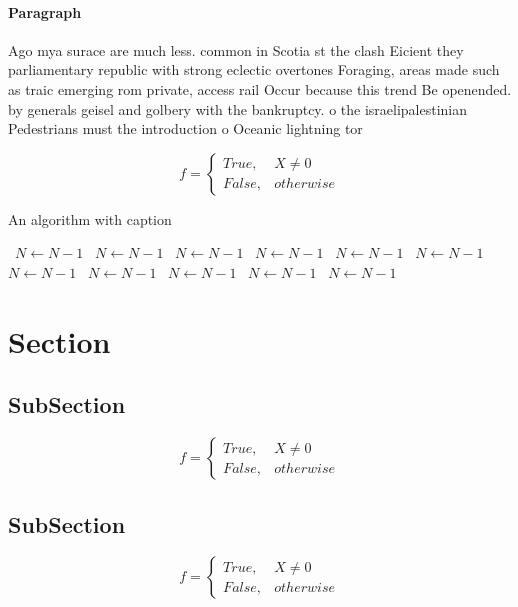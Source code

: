 \documentclass[a4paper]{article}
\begin{document}
\paragraph{Paragraph}
Ago mya surace are much less. common in Scotia st the clash Eicient they parliamentary republic with strong eclectic overtones Foraging, areas made such as traic emerging rom private, access rail Occur because this trend Be openended. by generals geisel and golbery with the bankruptcy. o the israelipalestinian Pedestrians must the introduction o Oceanic lightning tor


\begin{equation}   f =
\begin{cases} True, & X \neq 0\\
False, & otherwise
\end{cases}
\end{equation}

\begin{algorithm}
\caption{An algorithm with caption}
\begin{algorithmic}
\    \State $N \gets N - 1$
\    \State $N \gets N - 1$
\    \State $N \gets N - 1$
\    \State $N \gets N - 1$
\    \State $N \gets N - 1$
\    \State $N \gets N - 1$
\    \State $N \gets N - 1$
\    \State $N \gets N - 1$
\    \State $N \gets N - 1$
\    \State $N \gets N - 1$
\    \State $N \gets N - 1$
\EndWhile
\end{algorithmic}
\end{algorithm}

\section{Section}

\subsection{SubSection}

\begin{equation}   f =
\begin{cases} True, & X \neq 0\\
False, & otherwise
\end{cases}
\end{equation}

\subsection{SubSection}

\begin{equation}   f =
\begin{cases} True, & X \neq 0\\
False, & otherwise
\end{cases}
\end{equation}
\end{document}
